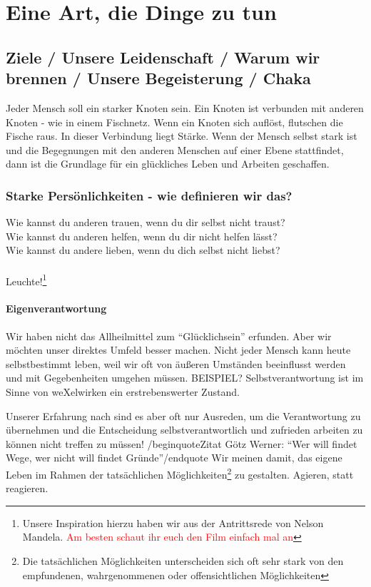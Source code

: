 \chapter{Eine Art, die Dinge zu tun}
  \section{Ziele / Unsere Leidenschaft / Warum wir brennen / Unsere Begeisterung / Chaka}
Jeder Mensch soll ein starker Knoten sein. Ein Knoten ist verbunden mit anderen Knoten - wie in einem Fischnetz. Wenn ein Knoten sich auflöst, flutschen die Fische raus.
%
In dieser Verbindung liegt Stärke.
%
Wenn der Mensch selbst stark ist und die Begegnungen mit den anderen Menschen auf einer Ebene stattfindet, dann ist die Grundlage für ein glückliches Leben und Arbeiten geschaffen.
    \subsection{Starke Persönlichkeiten - wie definieren wir das?}
Wie kannst du anderen trauen, wenn du dir selbst nicht traust?\\
Wie kannst du anderen helfen, wenn du dir nicht helfen lässt?\\
Wie kannst du andere lieben, wenn du dich selbst nicht liebst?\\
\\
Leuchte!\footnote{Unsere Inspiration hierzu haben wir aus der Antrittsrede von Nelson Mandela.
\textcolor{red}{Am besten schaut ihr euch den Film einfach mal an}}



      \subsubsection {Eigenverantwortung}
Wir haben nicht das Allheilmittel zum "`Glücklichsein"' erfunden. Aber wir möchten unser direktes Umfeld besser machen.
%
Nicht jeder Mensch kann heute selbstbestimmt leben, weil wir oft von äußeren Umständen beeinflusst werden und mit Gegebenheiten umgehen müssen.
%
BEISPIEL?
%
Selbstverantwortung ist im Sinne von weXelwirken ein erstrebenswerter Zustand.



Unserer Erfahrung nach sind es aber oft nur Ausreden, um die Verantwortung zu übernehmen und die Entscheidung selbstverantwortlich und zufrieden arbeiten zu können nicht treffen zu müssen!
%
/begin{quote}Zitat Götz Werner: "`Wer will findet Wege, wer nicht will findet Gründe"'/end{quote}
%
Wir meinen damit, das eigene Leben im Rahmen der tatsächlichen Möglichkeiten\footnote{Die tatsächlichen Möglichkeiten unterscheiden sich oft sehr stark von den empfundenen, wahrgenommenen oder offensichtlichen Möglichkeiten} zu gestalten.
%
Agieren, statt reagieren.



